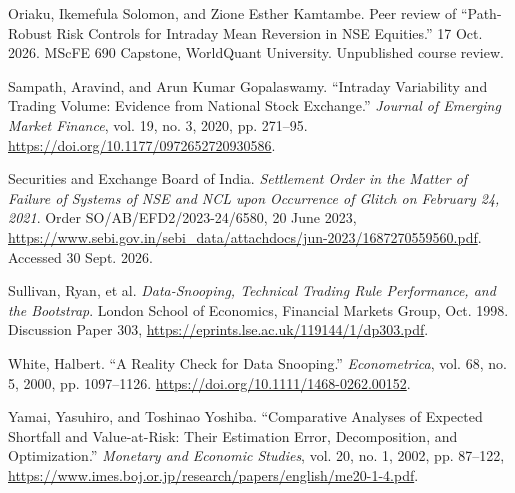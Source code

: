 \documentclass[11pt,a4paper]{article}
\begin{document}
{\RaggedRight\hangindent=1.27cm\noindent Oriaku, Ikemefula Solomon, and Zione Esther Kamtambe. Peer review of “Path-Robust Risk Controls for Intraday Mean Reversion in NSE Equities.” 17 Oct. 2026. MScFE 690 Capstone, WorldQuant University. Unpublished course review.\par}\vspace{5pt}

{\RaggedRight\hangindent=1.27cm\noindent Sampath, Aravind, and Arun Kumar Gopalaswamy. “Intraday Variability and Trading Volume: Evidence from National Stock Exchange.” \textit{Journal of Emerging Market Finance}, vol. 19, no. 3, 2020, pp. 271–95. \url{https://doi.org/10.1177/0972652720930586}.\par}\vspace{5pt}

{\RaggedRight\hangindent=1.27cm\noindent Securities and Exchange Board of India. \textit{Settlement Order in the Matter of Failure of Systems of NSE and NCL upon Occurrence of Glitch on February 24, 2021}. Order SO/AB/EFD2/2023-24/6580, 20 June 2023, \url{https://www.sebi.gov.in/sebi_data/attachdocs/jun-2023/1687270559560.pdf}. Accessed 30 Sept. 2026.\par}\vspace{5pt}

{\RaggedRight\hangindent=1.27cm\noindent Sullivan, Ryan, et al. \textit{Data-Snooping, Technical Trading Rule Performance, and the Bootstrap}. London School of Economics, Financial Markets Group, Oct. 1998. Discussion Paper 303, \url{https://eprints.lse.ac.uk/119144/1/dp303.pdf}.\par}\vspace{5pt}

{\RaggedRight\hangindent=1.27cm\noindent White, Halbert. “A Reality Check for Data Snooping.” \textit{Econometrica}, vol. 68, no. 5, 2000, pp. 1097–1126. \url{https://doi.org/10.1111/1468-0262.00152}.\par}\vspace{5pt}

{\RaggedRight\hangindent=1.27cm\noindent Yamai, Yasuhiro, and Toshinao Yoshiba. “Comparative Analyses of Expected Shortfall and Value-at-Risk: Their Estimation Error, Decomposition, and Optimization.” \textit{Monetary and Economic Studies}, vol. 20, no. 1, 2002, pp. 87--122, \url{https://www.imes.boj.or.jp/research/papers/english/me20-1-4.pdf}.\par}\vspace{5pt}
\end{document}
